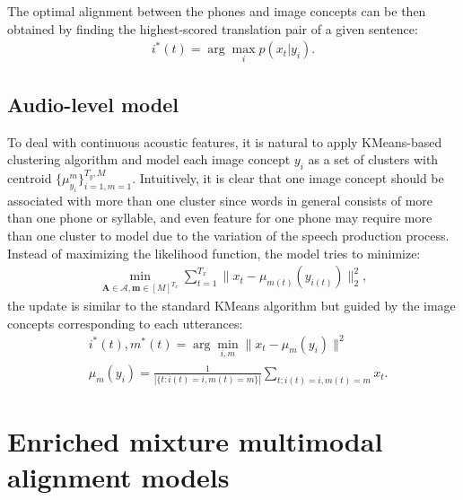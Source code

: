\documentclass[journal]{IEEEtran}
\begin{document}
The optimal alignment between the phones and image concepts can be then obtained by finding the highest-scored translation pair of a given sentence:
\begin{align}\label{eq:smt_alignment}
    i^*(t) = \arg\max_i p(x_t|y_i).
\end{align}

\subsection{Audio-level model}
To deal with continuous acoustic features, it is natural to apply
KMeans-based clustering algorithm and model each image concept $y_i$ as a set of clusters with centroid $\{\mu_{y_i}^m\}_{i=1, m=1}^{T_y, M}$. Intuitively, it is clear that one image concept should be associated with more than one cluster since words in general consists of more than one phone or syllable, and even feature for one phone may require more than one cluster to model due to the variation of the speech production process. Instead of maximizing the likelihood function, the model tries to minimize:
\begin{align}\label{eq:multimodal_kmeans_obj}
    \min_{\mathbf A \in \mathcal A, \mathbf m \in [M]^{T_x}} \sum_{t=1}^{T_x} \|x_t - \mu_{m(t)}(y_{i(t)})\|^2_2,
\end{align}
the update is similar to the standard KMeans algorithm but guided by the image concepts corresponding to each utterances:
\begin{align}\label{eq:multimodal_kmeans_update}
    &i^*(t), m^*(t) = \arg\min_{i, m}\|x_t - \mu_m(y_{i})\|^2\\
    &\mu_m(y_i) = \frac{1}{|\{t:i(t)=i, m(t)=m\}|}\sum_{t: i(t)=i, m(t)=m} x_t.
\end{align}


\section{Enriched mixture multimodal alignment models}
\end{document}
